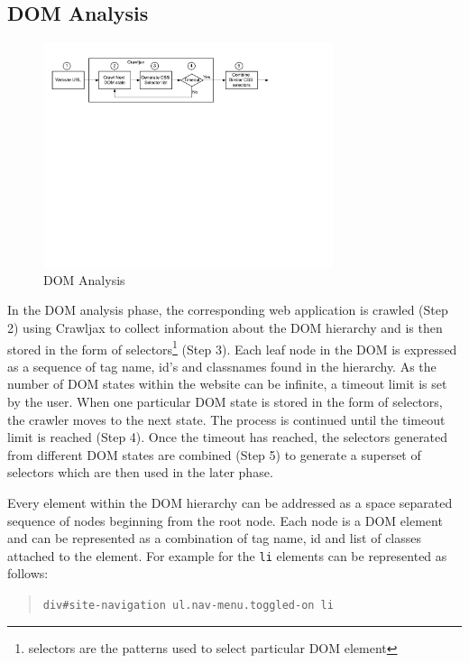 	\subsection{DOM Analysis}
	\label{Sec:DOM-Analysis}
		\begin{figure}
			\centering
			\includegraphics[width=85mm]{images/dom_analysis.pdf}
			\caption{DOM Analysis}
			\label{Fig:DOM-Analysis}
		\end{figure}
		In the DOM analysis phase, the corresponding web application is crawled (Step 2) using Crawljax \cite{crawljax:tweb12} to collect information about the DOM hierarchy and is then stored in the form of \css selectors\footnote{\css selectors are the patterns used to select particular DOM element} (Step 3). Each leaf node in the DOM is expressed as a sequence of tag name, id's and classnames found in the hierarchy. As the number of DOM states within the website can be infinite, a timeout limit is set by the user. When one particular DOM state is stored in the form of \css selectors, the crawler moves to the next state. The process is continued until the timeout limit is reached (Step 4). Once the timeout has reached, the \css selectors generated from different DOM states are combined (Step 5) to generate a superset of \css selectors which are then used in the later phase.
		
		Every element within the DOM hierarchy can be addressed as a space separated sequence of nodes beginning from the root node. Each node is a DOM element and can be represented as a combination of tag name, id and list of classes attached to the element. For example for  the \texttt{li} elements can be represented as follows:
			
		\begin{quote}
			\texttt{div\#site-navigation ul.nav-menu.toggled-on li}
		\end{quote}
			
